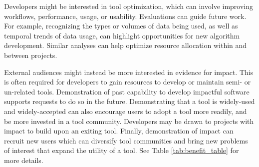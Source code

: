 \documentclass{article}
\begin{document}
Developers might be interested in tool optimization, which can involve improving workflows, performance, usage, or usability. Evaluations can guide future work. For example, recognizing the types or volumes of data being used, as well as temporal trends of data usage, can highlight opportunities for new algorithm development. Similar analyses can help optimize resource allocation within and between projects. 

External audiences might instead be more interested in evidence for impact. This is often required for developers to gain resources to develop or maintain semi- or un-related tools. Demonstration of past capability to develop impactful software supports requests to do so in the future. Demonstrating that a tool is widely-used and widely-accepted can also encourage users to adopt a tool more readily, and be more invested in a tool community. Developers may be drawn to projects with impact to build upon an exiting tool. Finally, demonstration of impact can recruit new users which can diversify tool communities and bring new problems of interest that expand the utility of a tool. See Table \ref{tab:benefit_table} for more details.
 
\end{document}
